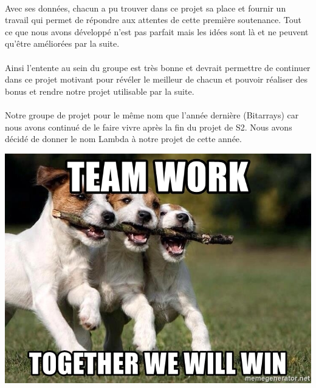 \documentclass{article}
\begin{document}
\paragraph{}Avec ses données, chacun a pu trouver dans ce projet sa place et fournir un travail qui permet de répondre aux attentes de cette première soutenance. Tout ce que nous avons développé n'est pas parfait mais les idées sont là et ne peuvent qu'être améliorées par la suite.

\paragraph{}Ainsi l'entente au sein du groupe est très bonne et devrait permettre de continuer dans ce projet motivant pour révéler le meilleur de chacun et pouvoir réaliser des bonus et rendre notre projet utilisable par la suite.

\paragraph{}Notre groupe de projet pour le même nom que l'année dernière (Bitarrays) car nous avons continué de le faire vivre après la fin du projet de S2. Nous avons décidé de donner le nom Lambda à notre projet de cette année.

\vspace*{0.5cm}
\begin{center}
	\includegraphics[scale=0.4]{work}
\end{center}

\end{document}

